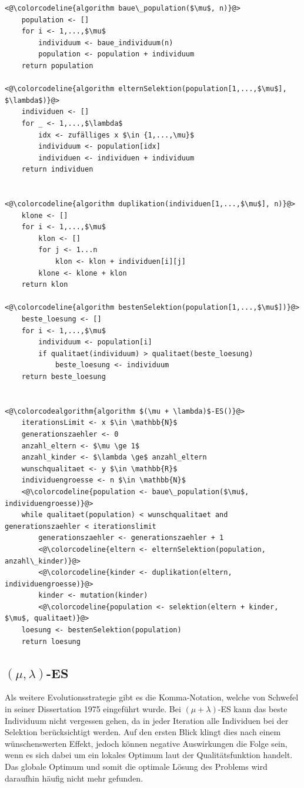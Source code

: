 \begin{lstlisting}[caption={$(\mu + \lambda)$-Evolutionsstrategie}, firstnumber=1, captionpos=b, label=lst:mu_und_lambda_es]
<@\colorcodeline{algorithm baue\_population($\mu$, n)}@>
	population <- []
	for i <- 1,...,$\mu$
		individuum <- baue_individuum(n)
		population <- population + individuum
	return population
	
<@\colorcodeline{algorithm elternSelektion(population[1,...,$\mu$], $\lambda$)}@>
	individuen <- []
	for _ <- 1,...,$\lambda$
		idx <- zufälliges x $\in {1,...,\mu}$
		individuum <- population[idx]
		individuen <- individuen + individuum
	return individuen
	

<@\colorcodeline{algorithm duplikation(individuen[1,...,$\mu$], n)}@>
	klone <- []
	for i <- 1,...,$\mu$
		klon <- []
		for j <- 1...n
			klon <- klon + individuen[i][j]
		klone <- klone + klon
	return klon
	
<@\colorcodeline{algorithm bestenSelektion(population[1,...,$\mu$])}@>
	beste_loesung <- []
	for i <- 1,...,$\mu$
		individuum <- population[i]
		if qualitaet(individuum) > qualitaet(beste_loesung)
			beste_loesung <- individuum
	return beste_loesung
	

<@\colorcodealgorithm{algorithm $(\mu + \lambda)$-ES()}@>
	iterationsLimit <- x $\in \mathbb{N}$
	generationszaehler <- 0
	anzahl_eltern <- $\mu \ge 1$
	anzahl_kinder <- $\lambda \ge$ anzahl_eltern
	wunschqualitaet <- y $\in \mathbb{R}$
	individuengroesse <- n $\in \mathbb{N}$
	<@\colorcodeline{population <- baue\_population($\mu$, individuengroesse)}@>
	while qualitaet(population) < wunschqualitaet and generationszaehler < iterationslimit
		generationszaehler <- generationszaehler + 1
		<@\colorcodeline{eltern <- elternSelektion(population, anzahl\_kinder)}@>
		<@\colorcodeline{kinder <- duplikation(eltern, individuengroesse)}@>
		kinder <- mutation(kinder)
		<@\colorcodeline{population <- selektion(eltern + kinder, $\mu$, qualitaet)}@>
	loesung <- bestenSelektion(population)
	return loesung
\end{lstlisting}

\subsection{$(\mu, \lambda)$-ES}

Als weitere Evolutionsstrategie gibt es die Komma-Notation, welche von Schwefel in seiner Dissertation 1975 eingeführt wurde. Bei $(\mu + \lambda)$-ES kann das beste Individuum nicht vergessen gehen, da in jeder Iteration alle Individuen bei der Selektion berücksichtigt werden. Auf den ersten Blick klingt dies nach einem wünschenswerten Effekt, jedoch können negative Auswirkungen die Folge sein, wenn es sich dabei um ein lokales Optimum laut der Qualitätsfunktion handelt.
Das globale Optimum und somit die optimale Lösung des Problems wird daraufhin häufig nicht mehr gefunden.

